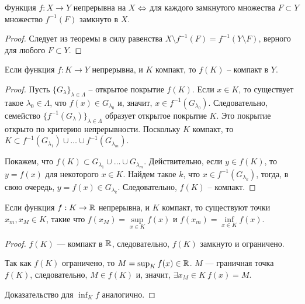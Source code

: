 \begin{corollary}
    Функция $f: X \to Y$ непрерывна на $X$ $\Leftrightarrow$ для каждого замкнутого множества $F \subset Y$ множество $f^{-1}(F)$ замкнуто в $X$.
\end{corollary}

\begin{proof}
    Следует из теоремы в силу равенства $X \setminus f^{-1}(F) = f^{-1}(Y \setminus F)$, верного для любого $F \subset Y$.
\end{proof}

\begin{theorem}
    Если функция $f: K \to Y$ непрерывна, и $K$ компакт, то $f(K)$ -- компакт в $Y$.
\end{theorem}

\begin{proof}
    Пусть $\{G_{\lambda}\}_{\lambda \in \Lambda}$ -- открытое покрытие $f(K)$. Если $x \in K$, то существует такое $\lambda_{0} \in \Lambda$, что $f(x) \in G_{\lambda_{0}}$ и, значит, $x \in f^{-1}(G_{\lambda_{0}})$. Следовательно, семейство $\{f^{-1}(G_{\lambda})\}_{\lambda \in \Lambda}$ образует открытое покрытие $K$. Это покрытие открыто по критерию непрерывности. Поскольку $K$ компакт, то $K \subset f^{-1}(G_{\lambda_{1}}) \cup \ldots \cup f^{-1}(G_{\lambda_{m}})$.

    Покажем, что $f(K) \subset G_{\lambda_{1}} \cup \ldots \cup G_{\lambda_{m}}$. Действительно, если $y \in f(K)$, то $y = f(x)$ для некоторого $x \in K$. Найдем такое $k$, что $x \in f^{-1}(G_{\lambda_{k}})$, тогда, в свою очередь, $y = f(x) \in G_{\lambda_{k}}$. Следовательно, $f(K)$ -- компакт.
\end{proof}

\begin{corollary}
    \label{weierstrass-compacts}
    Если функция $f: K \to \mathbb{R}$ непрерывна, и $K$ компакт, то существуют точки $x_{m}, x_{M} \in K$, такие что $f(x_{M}) = \underset{x \in K}{\sup}f(x)$ и $f(x_{m}) = \underset{x \in K}{\inf} f(x)$.
\end{corollary}

\begin{proof}
    $f(K)$ --- компакт в $\mathbb{R}$, следовательно, $f(K)$ замкнуто и ограничено.

    Так как $f(K)$ ограничено, то $M = \sup_K f(x) \in \mathbb{R}$. $M$ --- граничная точка $f(K)$, следовательно, $M \in f(K)$ и, значит, $\exists x_M \in K \ f(x) = M$.

    Доказательство для $\inf_K f$ аналогично.
\end{proof}

